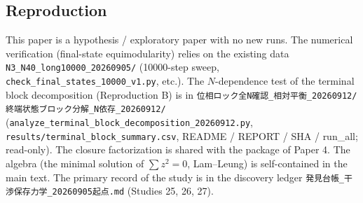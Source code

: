 \documentclass[
  a4paper,
]{ltjsarticle}
\begin{document}
\subsection{Reproduction}\label{reproduction}

This paper is a hypothesis / exploratory paper with no new runs. The
numerical verification (final-state equimodularity) relies on the
existing data \texttt{N3\_N40\_long10000\_20260905/} (10000-step sweep,
\texttt{check\_final\_states\_10000\_v1.py}, etc.). The \(N\)-dependence
test of the terminal block decomposition (Reproduction B) is in
\texttt{位相ロック全N確認\_相対平衡\_20260912/終端状態ブロック分解\_N依存\_20260912/}
(\texttt{analyze\_terminal\_block\_decomposition\_20260912.py},
\texttt{results/terminal\_block\_summary.csv}, README / REPORT / SHA /
run\_all; read-only). The closure factorization is shared with the
package of Paper 4. The algebra (the minimal solution of \(\sum z^2=0\),
Lam--Leung) is self-contained in the main text. The primary record of
the study is in the discovery ledger
\texttt{発見台帳\_干渉保存力学\_20260905起点.md} (Studies 25, 26, 27).
\end{document}
